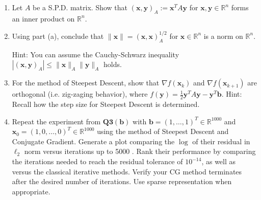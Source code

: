 \documentclass{report}
\begin{document}
{
\begin{enumerate}[label=(\alph*)]
\item Let $A$ be a S.P.D. matrix. Show that $(\boldsymbol{x}, \boldsymbol{y})_A:=\boldsymbol{x}^T A \boldsymbol{y}$ for $\boldsymbol{x}, \boldsymbol{y} \in \mathbb{R}^n$ forms an inner product on $\mathbb{R}^n$.
\item Using part (a), conclude that $\|\boldsymbol{x}\|=(\boldsymbol{x}, \boldsymbol{x})_A^{1 / 2}$ for $\boldsymbol{x} \in \mathbb{R}^n$ is a norm on $\mathbb{R}^n$.

Hint: You can assume the Cauchy-Schwarz inequality $\left|(\boldsymbol{x}, \boldsymbol{y})_A\right| \leq\|\boldsymbol{x}\|_A\|\boldsymbol{y}\|_A$ holds.
\item For the method of Steepest Descent, show that $\nabla f\left(\boldsymbol{x}_k\right)$ and $\nabla f\left(\boldsymbol{x}_{k+1}\right)$ are orthogonal (i.e. zig-zaging behavior), where $f(\boldsymbol{y})=\frac{1}{2} \boldsymbol{y}^T A \boldsymbol{y}-\boldsymbol{y}^T \boldsymbol{b}$. Hint: Recall how the step size for Steepest Descent is determined.
\item Repeat the experiment from $\mathbf{Q 3}(\mathbf{b})$ with $\boldsymbol{b}=(1, \ldots, 1)^T \in \mathbb{R}^{1000}$ and $\boldsymbol{x}_0=(1,0, \ldots, 0)^T \in \mathbb{R}^{1000}$ using the method of Steepest Descent and Conjugate Gradient. Generate a plot comparing the $\log$ of their residual in $\ell_2$ norm versus iterations up to 5000 . Rank their performance by comparing the iterations needed to reach the residual tolerance of $10^{-14}$, as well as versus the classical iterative methods. Verify your CG method terminates after the desired number of iterations. Use sparse representation when appropriate.
\end{enumerate}
}
\end{document}

